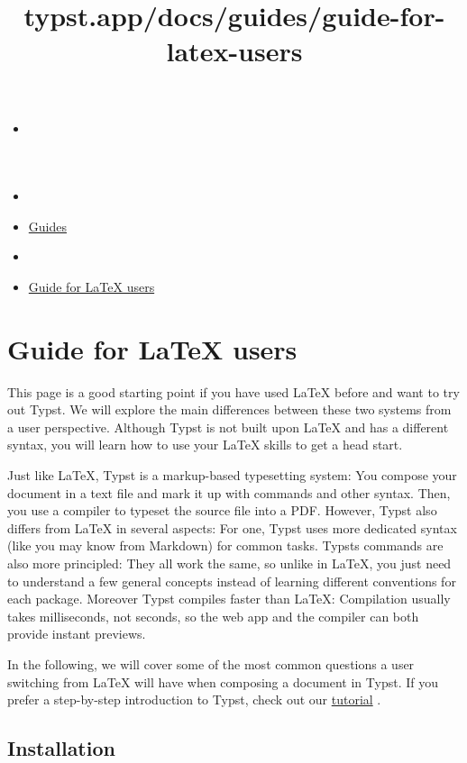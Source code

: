 \title{typst.app/docs/guides/guide-for-latex-users}

\begin{itemize}
\tightlist
\item
  \href{/docs}{}
\item
  
\item
  \href{/docs/guides/}{Guides}
\item
  
\item
  \href{/docs/guides/guide-for-latex-users/}{Guide for LaTeX users}
\end{itemize}

\section{Guide for LaTeX users}\label{guide-for-latex-users}

This page is a good starting point if you have used LaTeX before and
want to try out Typst. We will explore the main differences between
these two systems from a user perspective. Although Typst is not built
upon LaTeX and has a different syntax, you will learn how to use your
LaTeX skills to get a head start.

Just like LaTeX, Typst is a markup-based typesetting system: You compose
your document in a text file and mark it up with commands and other
syntax. Then, you use a compiler to typeset the source file into a PDF.
However, Typst also differs from LaTeX in several aspects: For one,
Typst uses more dedicated syntax (like you may know from Markdown) for
common tasks. Typst\textquotesingle s commands are also more principled:
They all work the same, so unlike in LaTeX, you just need to understand
a few general concepts instead of learning different conventions for
each package. Moreover Typst compiles faster than LaTeX: Compilation
usually takes milliseconds, not seconds, so the web app and the compiler
can both provide instant previews.

In the following, we will cover some of the most common questions a user
switching from LaTeX will have when composing a document in Typst. If
you prefer a step-by-step introduction to Typst, check out our
\href{/docs/tutorial/}{tutorial} .

\subsection{Installation}\label{installation}

